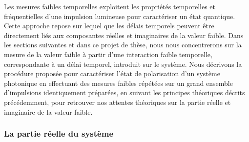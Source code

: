     
\begin{onehalfspace}
    Les mesures faibles temporelles exploitent les propriétés temporelles 
    et fréquentielles d’une impulsion lumineuse pour caractériser un état 
    quantique. Cette approche repose sur lequel que
    les délais temporels peuvent être directement liés aux composantes 
    réelles et imaginaires de la valeur faible. Dans les sections 
    suivantes et dans ce projet de thèse, nous nous concentrerons sur la 
    mesure de la valeur faible à partir d’une interaction faible 
    temporelle, correspondante à un délai temporel, introduit sur le système. 
    Nous décrivons la procédure proposée pour
    caractériser l'état de polarisation d'un système photonique 
    en effectuant des mesures faibles répétées sur un 
    grand ensemble d’impulsions identiquement préparées, en suivant les principes théoriques décrits précédemment,
    pour retrouver nos attentes théoriques sur la partie réelle et imaginaire de la valeur faible. 
\end{onehalfspace}

\subsubsection{La partie réelle du système}
    
